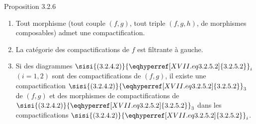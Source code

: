 \documentclass[10pt]{../fichiers-configuration-latex/smfart}
\begin{document}
\begin{enonce*}{Proposition 3.2.6}
\begin{enumerate}
\renewcommand{\theenumi}{\roman{enumi}}
\renewcommand{\labelenumi}{(\theenumi)}
\item Tout morphisme (\resp tout couple $(f,g)$, \resp tout triple
$(f,g,h)$, de morphismes composables) admet une compactification.

\item La catégorie des compactifications de $f$ est filtrante à
gauche.

\item Si des diagrammes $\sisi{(3.2.4.2)}{\eqhyperref[XVII.eq3.2.5.2]{3.2.5.2}}_i$ $(i=1,2)$ sont des
compactifications de $(f,g)$, il existe une compactification
$\sisi{(3.2.4.2)}{\eqhyperref[XVII.eq3.2.5.2]{3.2.5.2}}_3$ de $(f,g)$ et des morphismes de compactifications de
$\sisi{(3.2.4.2)}{\eqhyperref[XVII.eq3.2.5.2]{3.2.5.2}}_3$ dans les compactifications $\sisi{(3.2.4.2)}{\eqhyperref[XVII.eq3.2.5.2]{3.2.5.2}}_i$.
\end{enumerate}
\end{enonce*}
\end{document}
